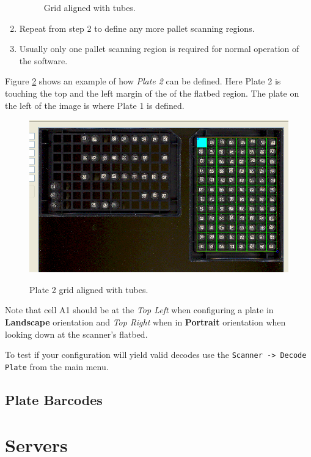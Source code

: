 \begin{enumerate}
\begin{figure}[H]
      \caption{Grid aligned with tubes.}
      \label{fig:plate1_grid_ready}
    \end{figure}
  \item Repeat from step 2 to define any more pallet scanning regions.
  \item Usually only one pallet scanning region is required for normal
    operation of the software.
\end{enumerate}
Figure \ref{fig:plate2_grid_ready} shows an example of how \emph{Plate 2} can
be defined. Here Plate 2 is touching the top and the left margin of
the of the flatbed region. The plate on the left of the image is where Plate 1
is defined.
    \begin{figure}[H]
      \centering
      \scalebox{0.5}
      { \includegraphics*{screenshots/configuration/plate2_grid_ready} }
      \caption{Plate 2 grid aligned with tubes.}
      \label{fig:plate2_grid_ready}
    \end{figure}
Note that cell A1 should be at the \emph{Top Left} when configuring a plate in
\textbf{Landscape} orientation and \emph{Top Right} when in \textbf{Portrait}
orientation when looking down at the scanner's flatbed.

To test if your configuration will yield valid decodes use the
\texttt{Scanner -> Decode Plate} from the main menu.
\subsection{Plate Barcodes}
\section{Servers}
